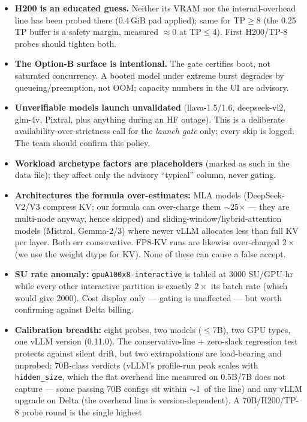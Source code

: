 \documentclass[11pt]{article}
\newcommand{\code}[1]{\texttt{#1}}
\newcommand{\gib}{\,\text{GiB}}
\begin{document}
\begin{itemize}[leftmargin=1.4em]
\item \textbf{H200 is an educated guess.} Neither its VRAM nor the
  internal-overhead line has been probed there ($0.4\gib$ pad applied);
  same for TP$\ge$8 (the 0.25\gib{} TP buffer is a safety margin, measured
  $\approx$0 at TP$\le$4). First H200/TP-8 probes should tighten both.
\item \textbf{The Option-B surface is intentional.} The gate certifies boot,
  not saturated concurrency. A booted model under extreme burst degrades by
  queueing/preemption, not OOM; capacity numbers in the UI are advisory.
\item \textbf{Unverifiable models launch unvalidated} (llava-1.5/1.6,
  deepseek-vl2, glm-4v, Pixtral, plus anything during an HF outage). This is
  a deliberate availability-over-strictness call for the \emph{launch gate}
  only; every skip is logged. The team should confirm this policy.
\item \textbf{Workload archetype factors are placeholders} (marked as such in
  the data file); they affect only the advisory ``typical'' column, never
  gating.
\item \textbf{Architectures the formula over-estimates:} MLA models
  (DeepSeek-V2/V3 compress KV; our formula can over-charge them
  $\sim$25$\times$ --- they are multi-node anyway, hence skipped) and
  sliding-window/hybrid-attention models (Mistral, Gemma-2/3) where newer
  vLLM allocates less than full KV per layer. Both err conservative.
  FP8-KV runs are likewise over-charged $2\times$ (we use the weight dtype
  for KV). None of these can cause a false accept.
\item \textbf{SU rate anomaly:} \code{gpuA100x8-interactive} is tabled at
  3000 SU/GPU-hr while every other interactive partition is exactly $2\times$
  its batch rate (which would give 2000). Cost display only --- gating is
  unaffected --- but worth confirming against Delta billing.
\item \textbf{Calibration breadth:} eight probes, two models ($\le$7B), two
  GPU types, one vLLM version (0.11.0). The conservative-line + zero-slack
  regression test protects against silent drift, but two extrapolations are
  load-bearing and unprobed: 70B-class verdicts (vLLM's profile-run peak
  scales with \code{hidden\_size}, which the flat overhead line measured on
  0.5B/7B does not capture --- some passing 70B configs sit within
  $\sim$1\gib{} of the line) and any vLLM upgrade on Delta (the overhead line
  is version-dependent). A 70B/H200/TP-8 probe round is the single highest

\end{itemize}
\end{document}
